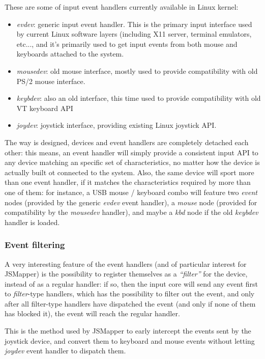 These are some of input event handlers currently available in Linux kernel:
\begin{itemize}
	\item \emph{evdev}: generic input event handler. This is the primary input interface used by current Linux software layers (including X11 server, terminal emulators, etc..., and it's primarily used to get input events from both mouse and keyboards attached to the system.
	\item \emph{mousedev}: old mouse interface, mostly used to provide compatibility with old PS/2 mouse interface.
	\item \emph{keybdev}: also an old interface, this time used to provide compatibility with old VT keyboard API
	\item \emph{joydev}: joystick interface, providing existing Linux joystick API.
\end{itemize}

The way is designed, devices and event handlers are completely detached each other: this means, an event handler will simply provide a consistent input API to any device matching an specific set of characteristics, no matter how the device is actually built ot connected to the system. Also, the same device will sport more than one event handler, if it matches the characteristics required by more than one of them: for instance, a USB mouse / keyboard combo will feature two \emph{event} nodes (provided by the generic \emph{evdev} event handler), a \emph{mouse} node (provided for compatibility by the \emph{mousedev} handler), and maybe a \emph{kbd} node if the old \emph{keybdev} handler is loaded.

\subsubsection{Event filtering}
A very interesting feature of the event handlers (and of particular interest for JSMapper) is the possibility to register themselves as a \emph{``filter''} for the device, instead of as a regular handler: if so, then the input core will send any event first to \emph{filter}-type handlers, which has the possibility to filter out the event, and only after all filter-type handlers have dispatched the event (and only if none of them has blocked it), the event will reach the regular handler.

This is the method used by JSMapper to early intercept the events sent by the joystick device, and convert them to keyboard and mouse events without letting \emph{joydev} event handler to dispatch them.


